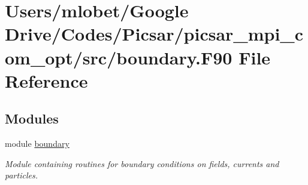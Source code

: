 \hypertarget{boundary_8_f90}{}\section{Users/mlobet/\+Google Drive/\+Codes/\+Picsar/picsar\+\_\+mpi\+\_\+com\+\_\+opt/src/boundary.F90 File Reference}
\label{boundary_8_f90}
\subsection*{Modules}
\begin{DoxyCompactItemize}
\item 
module \hyperlink{namespaceboundary}{boundary}
\begin{DoxyCompactList}\small\item\em Module containing routines for boundary conditions on fields, currents and particles. \end{DoxyCompactList}\end{DoxyCompactItemize}
